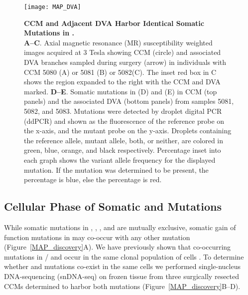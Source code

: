 \begin{figure}[!ht]
\centering
\texttt{[image: MAP\_DVA]}
\caption[CCM and Adjacent DVA Harbor Identical  Mutations]{\textbf{CCM and Adjacent DVA Harbor Identical Somatic Mutations in .\\}
\textbf{A--C}. Axial magnetic resonance (MR) susceptibility weighted images acquired at 3 Tesla showing CCM (circle) and associated DVA branches sampled during surgery (arrow) in individuals with CCM 5080 (A) or 5081 (B) or 5082(C). The inset red box in C shows the region expanded to the right with the CCM and DVA marked. \textbf{D--E}. Somatic mutations in  (D) and  (E) in CCM (top panels) and the associated DVA (bottom panels) from samples 5081, 5082, and 5083. Mutations were detected by droplet digital PCR (ddPCR) and shown as the fluorescence of the reference probe on the x-axis, and the mutant probe on the y-axis. Droplets containing the reference allele, mutant allele, both, or neither, are colored in green, blue, orange, and black respectively. Percentage inset into each graph shows the variant allele frequency for the displayed mutation. If the mutation was determined to be present, the percentage is blue, else the percentage is red.}

\label{MAP_DVA}
\end{figure}

\subsection{Cellular Phase of Somatic  and  Mutations}

While somatic mutations in , , , and  are mutually exclusive, somatic gain of function mutations in  may co-occur with any other mutation (Figure~\ref{MAP_discovery}A). We have previously shown that co-occurring mutations in / and  occur in the same clonal population of cells \citep{ren2021}. To determine whether  and  mutations co-exist in the same cells we performed single-nucleus DNA-sequencing (snDNA-seq) on frozen tissue from three surgically resected CCMs determined to harbor both mutations (Figure~\ref{MAP_discovery}B--D). 

